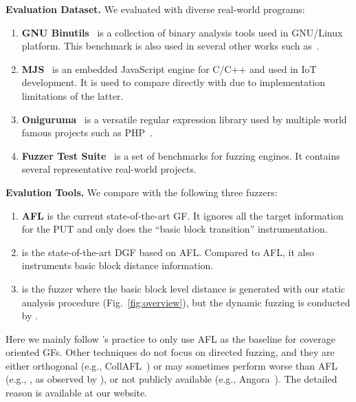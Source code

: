 \textbf{Evaluation Dataset.}
We evaluated \dFOT with diverse real-world programs:
\begin{enumerate}[(1)] 
    \item \textbf{GNU Binutils}~\cite{binutils} is a collection of binary analysis tools used in GNU/Linux platform. 
This benchmark is also used in several other works such as~\cite{Bohme:2016:CGF, Bohme:2017:DGF, 2017arXiv170907101L}.
    \item \textbf{MJS}~\cite{mjs} is an embedded JavaScript engine for C/C++ and used in IoT development.
    It is used to compare \dFOT directly with {\aflgo} due to implementation limitations of the latter.
    \item \textbf{Oniguruma}~\cite{oniguruma} is a versatile regular expression library used by multiple world famous projects such as PHP~\cite{php}.
    \item \textbf{Fuzzer Test Suite}~\cite{fuzzer-test-suite} is a set of benchmarks for fuzzing engines.
    It contains several representative real-world projects.
\end{enumerate}

\textbf{Evalution Tools.} We compare {\dFOT} with the following three fuzzers:
\begin{enumerate}[(1)] 
\item \textbf{AFL} is the current state-of-the-art GF. It ignores all the target information for the PUT and only does the ``basic block transition'' instrumentation.
\item \textbf{{\aflgo}} is the state-of-the-art DGF based on AFL.
Compared to AFL, it also instruments basic block distance information.
\item \textbf{{\dGO}} is the fuzzer where the basic block level distance is generated with our static analysis procedure (Fig.~\ref{fig:overview}), but the dynamic fuzzing is conducted by {\aflgo}.
\end{enumerate}

Here we mainly follow \aflgo's practice to only use AFL as the baseline for coverage oriented GFs. Other techniques do not focus on directed fuzzing, and they are either orthogonal (e.g., CollAFL~\cite{CollAFL}) or may sometimes perform worse than AFL (e.g., \aflfast, as observed by \cite{Shastry:LNCS2017:Orthrus}), or not publicly available (e.g., Angora~\cite{Angora}). The detailed reason is available at our website. %

